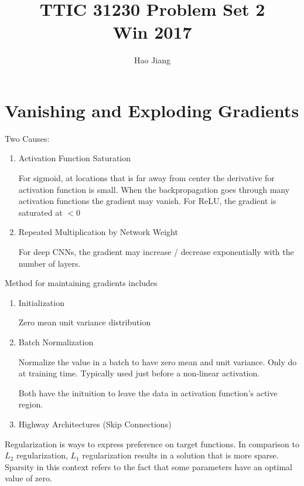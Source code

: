 \documentclass[11pt]{article}
\title{TTIC 31230 Problem Set 2 \\ Win 2017}
\author{Hao Jiang}
\begin{document}
\maketitle

\section*{Vanishing and Exploding Gradients}
Two Causes:
\begin{enumerate}
\item Activation Function Saturation

For sigmoid, at locations that is far away from center the derivative 
for activation function is small. When the backpropagation goes through 
many activation functions the gradient may vanish. For ReLU, the gradient 
is saturated at $<0$

\item Repeated Multiplication by Network Weight

For deep CNNs, the gradient may increase / decrease exponentially with the
number of layers.
\end{enumerate} 

Method for maintaining gradients includes
\begin{enumerate}
\item Initialization

Zero mean unit variance distribution
\item Batch Normalization

Normalize the value in a batch to have zero mean and unit variance. Only do
at training time. Typically used just before a non-linear activation.

Both have the inituition to leave the data in activation function's active
region.
\item Highway Architectures (Skip Connections)

\end{enumerate}
Regularization is ways to express preference on target functions.
In comparison to $L_2$ regularization, $L_1$ regularization results in a 
solution that is more sparse. Sparsity in this context refers to the fact 
that some parameters have an optimal value of zero.
\end{document}
